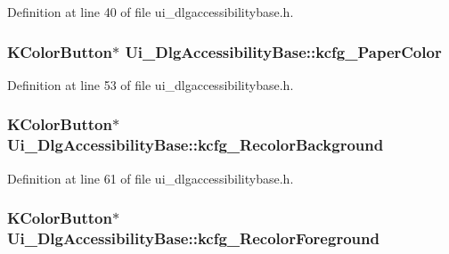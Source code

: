 Definition at line 40 of file ui\+\_\+dlgaccessibilitybase.\+h.

\hypertarget{classUi__DlgAccessibilityBase_ab1e0b4e4d2995754bd22f47faf578f96}{
\subsubsection[{kcfg\+\_\+\+Paper\+Color}]{\setlength{\rightskip}{0pt plus 5cm}K\+Color\+Button$\ast$ Ui\+\_\+\+Dlg\+Accessibility\+Base\+::kcfg\+\_\+\+Paper\+Color}}\label{classUi__DlgAccessibilityBase_ab1e0b4e4d2995754bd22f47faf578f96}


Definition at line 53 of file ui\+\_\+dlgaccessibilitybase.\+h.

\hypertarget{classUi__DlgAccessibilityBase_a3dfcfe3b0a86924c2c0eda7ec68f3d2a}{
\subsubsection[{kcfg\+\_\+\+Recolor\+Background}]{\setlength{\rightskip}{0pt plus 5cm}K\+Color\+Button$\ast$ Ui\+\_\+\+Dlg\+Accessibility\+Base\+::kcfg\+\_\+\+Recolor\+Background}}\label{classUi__DlgAccessibilityBase_a3dfcfe3b0a86924c2c0eda7ec68f3d2a}


Definition at line 61 of file ui\+\_\+dlgaccessibilitybase.\+h.

\hypertarget{classUi__DlgAccessibilityBase_a14be3b2a0c3099a08d2e58732feca0e6}{
\subsubsection[{kcfg\+\_\+\+Recolor\+Foreground}]{\setlength{\rightskip}{0pt plus 5cm}K\+Color\+Button$\ast$ Ui\+\_\+\+Dlg\+Accessibility\+Base\+::kcfg\+\_\+\+Recolor\+Foreground}}\label{classUi__DlgAccessibilityBase_a14be3b2a0c3099a08d2e58732feca0e6}


